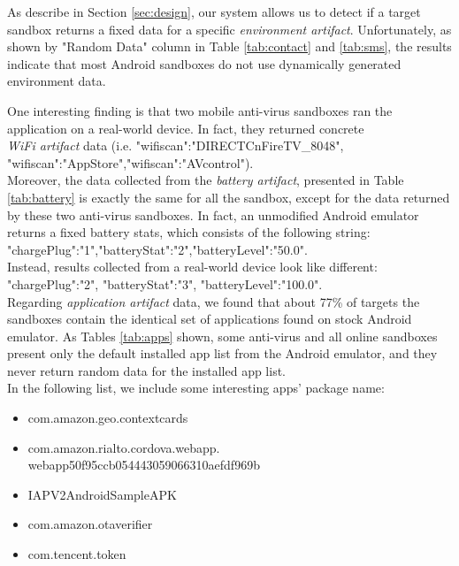 As describe in Section \ref{sec:design}, our system allows us to detect if a target sandbox returns a fixed data for a specific \textit{environment artifact}. Unfortunately, as shown by "Random Data" column in Table \ref{tab:contact} and \ref{tab:sms}, the results indicate that most Android sandboxes do not use dynamically generated environment data.

One interesting finding is that two mobile anti-virus sandboxes ran the application on a real-world device. In fact, they returned concrete \\
\textit{Wi\-Fi artifact} data (i.e. "wifiscan":"DIRECT\-Cn\-FireTV\_8048",\\
"wifiscan":"AppStore","wifiscan":"AVcontrol"). \\
Moreover, the data collected from the \textit{battery artifact}, presented in Table \ref{tab:battery} is exactly the same for all the sandbox, except for the data returned by these two anti-virus sandboxes. In fact, an unmodified Android emulator returns a fixed battery stats, which consists of the following string: \\
"chargePlug":"1","batteryStat":"2","batteryLevel":"50.0". \\
Instead, results collected from a real-world device look like different: \\
"chargePlug":"2", "batteryStat":"3", "batteryLevel":"100.0". \\ 
Regarding \textit{application artifact} data, we found that about 77\% of targets the sandboxes contain the identical set of applications found on stock Android emulator. As Tables \ref{tab:apps} shown, some anti-virus and all online sandboxes present only the default installed app list from the Android emulator, and they never return random data for the installed app list. \\

In the following list, we include some interesting apps' package name:

\begin{itemize}
\item com.amazon.geo.contextcards
\item com.amazon.rialto.cordova.webapp. 	\\	webapp50f95ccb054443059066310aefdf969b 
\item IAPV2AndroidSampleAPK
\item com.amazon.otaverifier
\item com.tencent.token
\end{itemize}




